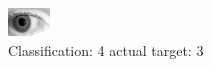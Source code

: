 \begin{figure}[h!]
\begin{center}
\includegraphics[width=0.60\columnwidth]{figures/ID327_class_4_target_3.png}
\end{center}
\caption{ Classification: 4 actual target: 3}
\label{fig:ID327_class_4_target_3}
\end{figure}
